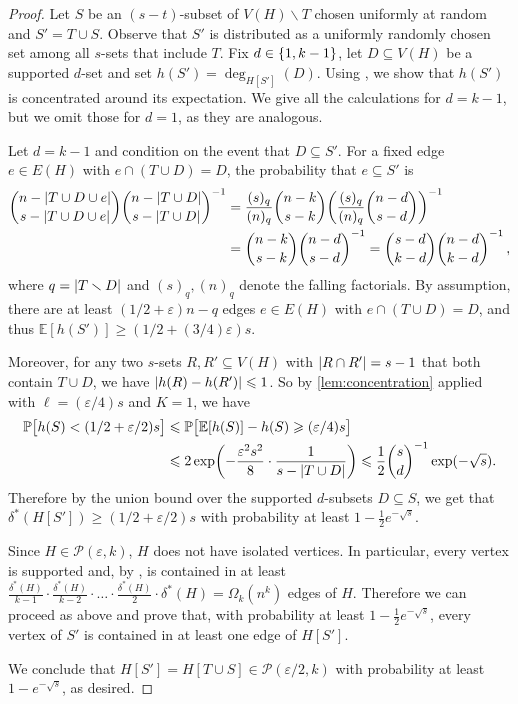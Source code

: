 \documentclass[12pt,reqno]{amsart}
\theoremstyle{plain}
\theoremstyle{definition}
\numberwithin{equation}{section}
\newcommand{\Prob}{\mathbb{P}}
\newcommand{\Exp}{\mathbb{E}}
\DeclarePairedDelimiter{\abs}{\lvert}{\rvert}
\DeclarePairedDelimiter{\set}{\{}{\}}
\renewcommand{\ge}{\geqslant}
\renewcommand{\geq}{\geqslant}
\renewcommand{\leq}{\leqslant}
\renewcommand{\setminus}{\smallsetminus}
\renewcommand{\subset}{\subseteq}
\newcommand{\eps}{\varepsilon}
\newcommand{\comin}{\delta^{\ast}}
\newcommand{\cP}{\mathcal{P}}
\begin{document}
	\begin{proof}
		Let $S$ be an $(s-t)$-subset of $V(H) \setminus T$ chosen uniformly at random and $S'=T \cup S$.
		Observe that $S'$ is distributed as a uniformly randomly chosen set among all $s$-sets that include $T$.
		Fix $d \in \set{1,k - 1}$, let $D \subseteq V(H)$ be a supported $d$-set and set $h(S') = \deg_{H[S']}(D)$.
		Using , we show that $h(S')$ is concentrated around its expectation.
		We give all the calculations for $d=k - 1$, but we omit those for $d=1$, as they are analogous.
		
		
		Let $d=k - 1$ and condition on the event that $D \subseteq S'$.
For a fixed edge $e \in E(H)$ with $e \cap (T \cup D) = D$, the probability that $e \subset S'$ is
		\begin{align}
			\label{eq:probability_e_S'}
			\begin{split}
\binom{n - \abs{T \cup D \cup e}}{s - \abs{T \cup D \cup e}} \binom{n - \abs{T \cup D}}{s - \abs{T \cup D}}^{-1}
				& = \frac{(s)_{q}}{(n)_{q}} \binom{n-k}{s-k} \biggl(\frac{(s)_{q}}{(n)_{q}}\binom{n-d}{s-d}\biggr)^{-1} \\
				& = \binom{n-k}{s-k} \binom{n-d}{s-d}^{-1} = \binom{s-d}{k-d} \binom{n-d}{k-d}^{-1}\, ,
			\end{split}
		\end{align}
		where $q = \abs{T \setminus D}$ and $(s)_q, (n)_q$ denote the falling factorials.
		By assumption, there are at least $(1/2 + \eps) n - q$ edges $e \in E(H)$ with $e \cap (T \cup D) = D$, and thus $\Exp [h(S')] \geq  (1/2 + (3/4) \eps) s$.
		
		Moreover, for any two $s$-sets $R,R' \subset V(H)$  with $\abs{R \cap R'} = s - 1$ that both contain $T \cup D$, we have $\abs{h(R) - h(R')} \leq 1$.
		So by \cref{lem:concentration} applied with $\ell = (\eps/4) s$ and $K = 1$, we have
		\begin{align*}
			\Prob\bigl[h(S) < (1/2 + \eps/2) s \bigr] & \leq \Prob \bigl[\Exp[h(S)] - h(S) \geq  (\eps/4) s \bigr]                                                                             \\
			& \leq 2 \exp\biggl(-\frac{\eps^2 s^2}{8} \cdot \frac{1}{s - \abs{T \cup D}}\biggr) \leq \frac{1}{2} \binom{s}{d}^{-1} \exp(-\sqrt{s}) .
		\end{align*}
		Therefore by the union bound over the supported $d$-subsets $D \subseteq S$, we get that $\comin(H[S']) \ge (1/2+\eps/2)s$ with probability at least $1-\frac{1}{2}e^{-\sqrt{s}}$.
		
		Since $H \in \cP(\eps,k)$, $H$ does not have isolated vertices.
		In particular, every vertex is supported and, by , is contained in at least $\frac{\comin(H)}{k - 1} \cdot \frac{\comin(H)}{k-2} \cdot \dots \cdot \frac{\comin(H)}{2} \cdot \comin(H) = \Omega_k(n^k)$ edges of $H$.
		Therefore we can proceed as above and prove that, with probability at least $1-\frac{1}{2}e^{-\sqrt{s}}$, every vertex of $S'$ is contained in at least one edge of $H[S']$.
		
		We conclude that $H[S']=H[T \cup S] \in \cP(\eps/2,k)$ with probability at least $1-e^{-\sqrt{s}}$, as desired.
	\end{proof}
	
\end{document}
